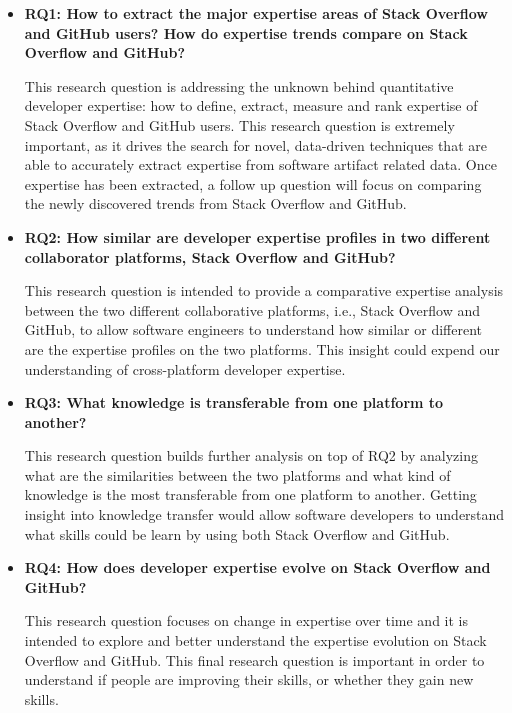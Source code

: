         \begin{itemize}
            \item \textbf{RQ1: How to extract the major expertise areas of Stack Overflow and GitHub users? How do expertise trends compare on Stack Overflow and GitHub?}
            
            This research question is addressing the unknown behind quantitative developer expertise: how to define, extract, measure and rank expertise of Stack Overflow and GitHub users. This research question is extremely important, as it drives the search for novel, data-driven techniques that are able to accurately extract expertise from software artifact related data. Once expertise has been extracted, a follow up question will focus on comparing the newly discovered trends from Stack Overflow and GitHub.
            
            \item \textbf{RQ2: How similar are developer expertise profiles in two different collaborator platforms, Stack Overflow and GitHub?}
            
            This research question is intended to provide a comparative expertise analysis between the two different collaborative platforms, i.e., Stack Overflow and GitHub, to allow software engineers to understand how similar or different are the expertise profiles on the two platforms. This insight could expend our understanding of cross-platform developer expertise.
            
            \item \textbf{RQ3: What knowledge is transferable from one platform to another?}
            
            This research question builds further analysis on top of RQ2 by analyzing what are the similarities between the two platforms and what kind of knowledge is the most transferable from one platform to another. Getting insight into knowledge transfer would allow software developers to understand what skills could be learn by using both Stack Overflow and GitHub.
            
            \item \textbf{RQ4: How does developer expertise evolve on Stack Overflow and GitHub?}
            
            This research question focuses on change in expertise over time and it is intended to explore and better understand the expertise evolution on Stack Overflow and GitHub. This final research question is important in order to understand if people are improving their skills, or whether they gain new skills.
        \end{itemize}
        
